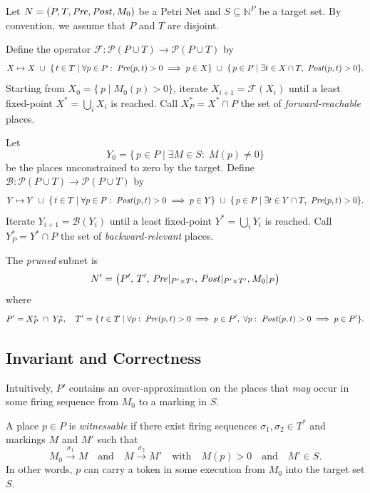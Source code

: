 Let $N=(P,T,\mathit{Pre},\mathit{Post}, M_0)$ be a Petri Net and $S\subseteq\mathbb{N}^P$ be a target set.
%
By convention, we assume that $P$ and $T$ are disjoint.
 
\begin{definition}
	Define the operator $\mathcal{F}:\mathcal{P}(P\cup T)\to\mathcal{P}(P\cup T)$ by
	\[
	X \mapsto X
	~\cup~
	\{\,t\in T \mid \forall p\in P:\; \mathit{Pre}(p,t)>0 \implies p\in X\}
	~\cup~
	\{\,p\in P \mid \exists t\in X\cap T,\ \mathit{Post}(p,t)>0\}.
	\]
	Starting from $X_0 = \{\,p\mid M_0(p)>0\}$, iterate
	$X_{i+1} = \mathcal{F}(X_i)$ until a least fixed-point
	$X^*=\bigcup_i X_i$ is reached.  Call $X^*_P = X^*\cap P$ the set of
	\emph{forward-reachable} places.
\end{definition}

\begin{definition}
	Let
	\[
	Y_0 = \{\,p\in P \mid \exists M\in S:\;M(p)\neq0\}
	\]
	be the places unconstrained to zero by the target.  Define
	$\mathcal{B}:\mathcal{P}(P\cup T)\to\mathcal{P}(P\cup T)$ by
	\[
	Y \mapsto Y
	~\cup~
	\{\,t\in T \mid \forall p\in P:\; \mathit{Post}(p,t)>0 \implies p\in Y\}
	~\cup~
	\{\,p\in P \mid \exists t\in Y\cap T,\ \mathit{Pre}(p,t)>0\}.
	\]
	Iterate $Y_{i+1} = \mathcal{B}(Y_i)$ until a least fixed-point
	$Y^*=\bigcup_i Y_i$ is reached.  Call $Y^*_P = Y^*\cap P$ the set of
	\emph{backward-relevant} places.
\end{definition}

\begin{definition}
	The \emph{pruned} subnet is
	\[
	N' = \bigl(P',\,T',\,\mathit{Pre}|_{P'\times T'},\,\mathit{Post}|_{P'\times T'}, M_0|_{P}\bigr)
	\]
	where
	\[
	P' = X^*_P \;\cap\; Y^*_P,
	\quad
	T' = \{\,t\in T \mid
	\forall p:\;\mathit{Pre}(p,t)>0\implies p\in P',\;
	\forall p:\;\mathit{Post}(p,t)>0\implies p\in P'
	\}.
	\]
\end{definition}

\subsection{Invariant and Correctness}

Intuitively, $P'$ contains an over-approximation on the places that
\emph{may} occur in some firing sequence from $M_0$ to a marking in $S$.

\begin{definition}
	A place $p\in P$ is \emph{witnessable} if there exist firing
	sequences $\sigma_1,\sigma_2\in T^*$ and markings $M$ and $M'$ such that
	\[
	M_0 \xrightarrow{\sigma_1} M
	\quad\text{and}\quad
	M \xrightarrow{\sigma_2} M'
	\quad\text{with}\quad
	M(p)>0
	\quad\text{and}\quad
	M'\in S.
	\]
	In other words, $p$ can carry a token in some execution from $M_0$ into the target set $S$.
\end{definition}

